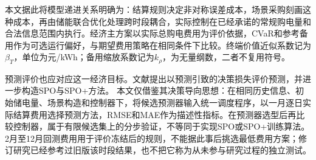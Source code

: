 本文据此将模型递进关系明确为：结算规则决定非对称误差成本，场景采购刻画这种成本，再由储能联合优化处理跨时段耦合，实际控制在已经承诺的常规购电量和合法信息范围内执行。经济主方案以实际总购电费用为评价依据，CVaR和参考备用作为可选运行偏好，与期望费用策略在相同条件下比较。终端价值近似系数记为$\beta_T$，单位为元/kWh；备用缩放系数记为$k_\rho$，为无量纲数，二者不复用符号。

预测评价也应对应这一经济目标。文献\cite{elmachtoub2017spo}提出以预测引致的决策损失评价预测，并进一步构造SPO与SPO+方法。
本文仅借鉴其决策导向思想：在相同历史信息、初始储电量、场景构造和控制器下，将候选预测器输入统一调度程序，以一月逐日实际结算费用选择预测方法，RMSE和MAE作为描述性指标。在预测器选型后再比较控制器，属于有限候选集上的分步验证，不等同于实现SPO或SPO+训练算法。2月至12月回测费用用于评价冻结后的规则，不能据此事后挑选最低费用方案；修订研究已经参考过旧版该时段结果，也不把它称为从未参与研究过程的独立测试。
